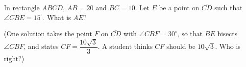 In rectangle $ABCD$, $AB=20$ and $BC=10$. Let $E$ be a point on $\overline{CD}$ such that $\angle CBE=15^\circ$. What is $AE$?

(One solution takes the point $F$ on $\overline{CD}$ with $\angle CBF=30^\circ$, so that $BE$ bisects $\angle CBF$, and states $CF=\dfrac{10\sqrt3}{3}$. A student thinks $CF$ should be $10\sqrt3$. Who is right?)
